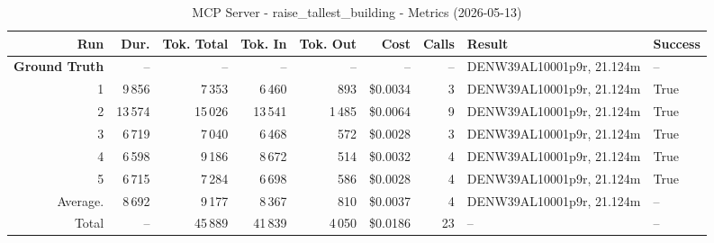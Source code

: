 \documentclass[a4paper,11pt]{article}
\begin{document}
\begin{table}[ht]
\centering
\scriptsize
\caption{MCP Server - raise\_tallest\_building - Metrics (2026-05-13)}
\label{tab:mcp\_raise\_tallest\_building\_metrics\_2026-05-13}
\begin{tabular}{r r r r r r r p{3cm} l}
\hline
Run & Dur. & Tok. Total & Tok. In & Tok. Out & Cost & Calls & Result & Success \\
\hline
\textbf{Ground Truth} & -- & -- & -- & -- & -- & -- & DENW39AL10001p9r, 21.124m & -- \\
\hline
1 & 9\,856 & 7\,353 & 6\,460 & 893 & \$0.0034 & 3 & DENW39AL10001p9r, 21.124m & True \\
2 & 13\,574 & 15\,026 & 13\,541 & 1\,485 & \$0.0064 & 9 & DENW39AL10001p9r, 21.124m & True \\
3 & 6\,719 & 7\,040 & 6\,468 & 572 & \$0.0028 & 3 & DENW39AL10001p9r, 21.124m & True \\
4 & 6\,598 & 9\,186 & 8\,672 & 514 & \$0.0032 & 4 & DENW39AL10001p9r, 21.124m & True \\
5 & 6\,715 & 7\,284 & 6\,698 & 586 & \$0.0028 & 4 & DENW39AL10001p9r, 21.124m & True \\
\hline
Average. & 8\,692 & 9\,177 & 8\,367 & 810 & \$0.0037 & 4 & DENW39AL10001p9r, 21.124m & -- \\
Total & -- & 45\,889 & 41\,839 & 4\,050 & \$0.0186 & 23 & -- & -- \\
\hline
\end{tabular}
\end{table}

\clearpage
\end{document}
